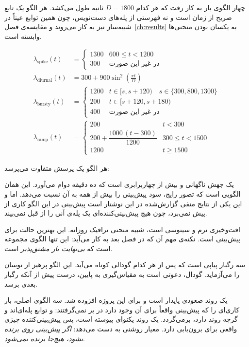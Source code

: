 چهار الگوی بار به کار رفت که هر کدام $D = 1800$ ثانیه طول می‌کشد. هر الگو یک تابع صریح از
زمان است و نه فهرستی از پله‌های دست‌نویس، چون همین توابع عیناً در شبیه‌ساز نیز به کار
می‌روند و مقایسه‌ی فصل~\ref{ch:results} به یکسان بودن منحنی‌ها وابسته است.

\begin{align}
\label{eq:pattern-spike}
\lambda_{\mathrm{spike}}(t) &=
\begin{cases}
1300 & 600 \le t < 1200 \\
300 & \text{در غیر این صورت}
\end{cases} \\[2mm]
\label{eq:pattern-diurnal}
\lambda_{\mathrm{diurnal}}(t) &= 300 + 900 \sin^2\!\left(\frac{\pi t}{D}\right) \\[2mm]
\label{eq:pattern-bursty}
\lambda_{\mathrm{bursty}}(t) &=
\begin{cases}
1200 & t \in [s, s+120) \quad s \in \{300, 800, 1300\} \\
200 & t \in [s+120, s+180) \\
400 & \text{در غیر این صورت}
\end{cases} \\[2mm]
\label{eq:pattern-ramp}
\lambda_{\mathrm{ramp}}(t) &=
\begin{cases}
200 & t < 300 \\
200 + \dfrac{1000\,(t-300)}{1200} & 300 \le t < 1500 \\
1200 & t \ge 1500
\end{cases}
\end{align}

هر الگو یک پرسش متفاوت می‌پرسد:

\textbf{} یک جهش ناگهانی و بیش از چهاربرابری است که ده دقیقه دوام می‌آورد.
این همان الگویی است که تصور رایج، سود پیش‌بینی را بیش از همه به آن نسبت می‌دهد. اما \mdash{}
و این یکی از نتایج منفی گزارش‌شده در این نوشتار است \mdash{} پیش‌بینی در این الگو کاری از پیش
نمی‌برد، چون هیچ پیش‌بینی‌کننده‌ای یک پله‌ی آنی را از قبل نمی‌بیند.

\textbf{} افت‌وخیزی نرم و سینوسی است، شبیه منحنی ترافیک روزانه. این بهترین حالت
برای پیش‌بینی است. نکته‌ی مهم آن که در فصل بعد به کار می‌آید: این تنها الگوی مجموعه است که
\emph{بی‌نهایت بار مشتق‌پذیر} است.

\textbf{} سه رگبار پیاپی است که پس از هر کدام گودالی کوتاه می‌آید. این الگو پرهیز
از نوسان را می‌آزماید. گودال، دعوتی است به مقیاس‌گیری به پایین، درست پیش از آنکه رگبار بعدی
برسد.

\textbf{} یک روند صعودی پایدار است و برای این پروژه افزوده شد. سه الگوی اصلی، بار
کاری‌ای را که پیش‌بینی واقعاً برای آن وجود دارد در بر نمی‌گرفتند:  و 
توابع پله‌ای‌اند و  گرچه روند دارد، برمی‌گردد.  یک روند یکنوای پیوسته
است، پس پیش‌بینی‌کننده چیزی واقعی برای برون‌یابی دارد. معیار روشنی به دست می‌دهد:
\emph{اگر پیش‌بینی روی  برنده نشود، هیچ‌جا برنده نمی‌شود}.

